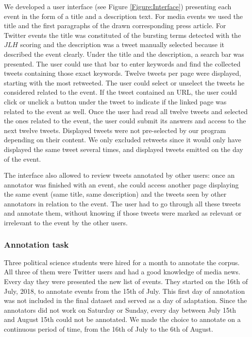 We developed a user interface (see Figure \ref{Figure:Interface}) presenting each event in the form of a title and a description text. For media events we used the title and the first paragraphs of the drawn corresponding press article. For Twitter events the title was constituted of the bursting terms detected with the $JLH$ scoring and the description was a tweet manually selected because it described the event clearly. Under the title and the description, a search bar was presented. The user could use that bar to enter keywords and find the collected tweets containing those exact keywords. Twelve tweets per page were displayed, starting with the most retweeted. The user could select or unselect the tweets he considered related to the event. If the tweet contained an URL, the user could click or unclick a button under the tweet to indicate if the linked page was related to the event as well. Once the user had read all twelve tweets and selected the ones related to the event, the user could submit its answers and access to the next twelve tweets. Displayed tweets were not pre-selected by our program depending on their content. We only excluded retweets since it would only have displayed the same tweet several times, and displayed tweets emitted on the day of the event. 


The interface also allowed to review tweets annotated by other users: once an annotator was finished with an event, she could access another page displaying the same event (same title, same description) and the tweets seen by other annotators in relation to the event. The user had to go through all these tweets and annotate them, without knowing if those tweets were marked as relevant or irrelevant to the event by the other users.

		\subsubsection{Annotation task}
	Three political science students were hired for a month to annotate the corpus. All three of them were Twitter users and had a good knowledge of media news. Every day they were presented the new list of events. They started on the 16th of July, 2018, to annotate events from the 15th of July. This first day of annotation was not included in the final dataset and served as a day of adaptation. Since the annotators did not work on Saturday or Sunday, every day between July 15th and August 15th could not be annotated. We made the choice to annotate on a continuous period of time, from the 16th of July to the 6th of August.


